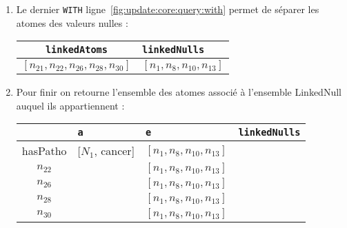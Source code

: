 \begin{example}
\begin{enumerate}[label=Etape~\arabic*]
		\item Le dernier \verb|WITH| ligne~\ref{fig:update:core:query:with} permet de séparer les atomes des valeurs nulles :
		\begin{center}
			\begin{tabular}{cl}
				\hline
				\verb|linkedAtoms| & \verb|linkedNulls| \\
				\hline
				$[n_{21}, n_{22}, n_{26}, n_{28}, n_{30}]$ & $[n_{1}, n_{8}, n_{10}, n_{13}]$\\
				\hline
			\end{tabular}
		\end{center}
		\item Pour finir on retourne l'ensemble des atomes associé à l'ensemble \textsf{LinkedNull} auquel ils appartiennent :
		\begin{center}
			\begin{tabular}{cll}
				\hline
				& \verb|a| & \verb|e| & \verb|linkedNulls| \\
				\hline
				hasPatho & [$N_1$, cancer] & $[n_{1}, n_{8}, n_{10}, n_{13}]$\\
				$n_{22}$ &  & $[n_{1}, n_{8}, n_{10}, n_{13}]$\\
				$n_{26}$ &  & $[n_{1}, n_{8}, n_{10}, n_{13}]$\\
				$n_{28}$ &  & $[n_{1}, n_{8}, n_{10}, n_{13}]$\\
				$n_{30}$ &  & $[n_{1}, n_{8}, n_{10}, n_{13}]$\\
				\hline
			\end{tabular}
		\end{center}
	\end{enumerate}
\end{example}

